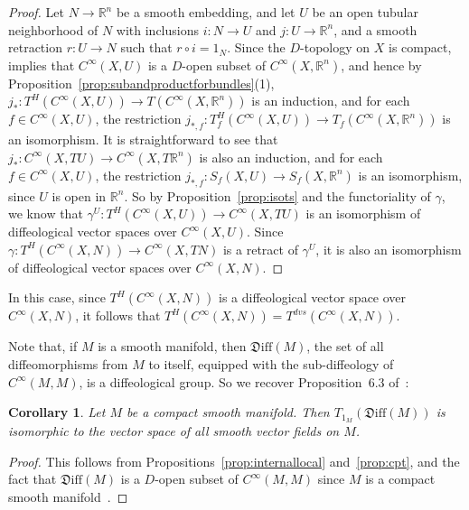 \documentclass{amsart}
\newtheorem{cor}[de]{Corollary}
\theoremstyle{remark}
\newcommand{\ra}{\to}
\newcommand{\Diff}{{\mathfrak{D}\mathrm{iff}}}
\def \R{\mathbb{R}}
\begin{document}
\begin{proof}
Let $N \ra \R^n$ be a smooth embedding,
and let $U$ be an open tubular neighborhood of $N$
with inclusions $i:N \ra U$ and $j:U \ra \R^n$,
and a smooth retraction $r:U \ra N$ such that $r \circ i=1_N$.
Since the $D$-topology on $X$ is compact,~\cite[Proposition~4.2]{CSW} implies that
$C^\infty(X,U)$ is a $D$-open subset of $C^\infty(X,\R^n)$,
and hence by Proposition~\ref{prop:subandproductforbundles}(1),
$j_*:T^H(C^\infty(X,U)) \ra T(C^\infty(X,\R^n))$ is an induction, and
for each $f \in C^\infty(X,U)$, the restriction
$j_{*,f}:T_f^H(C^\infty(X,U)) \ra T_f(C^\infty(X,\R^n))$ is an isomorphism.
It is straightforward to see that $j_*:C^\infty(X,TU) \ra C^\infty(X,T\R^n)$
is also an induction, and for each $f \in C^\infty(X,U)$,
the restriction $j_{*,f}:S_f(X,U) \ra S_f(X,\R^n)$
is an isomorphism, since $U$ is open in $\R^n$.
So by Proposition~\ref{prop:isots} and the functoriality of $\gamma$,
we know that $\gamma^U:T^H(C^\infty(X,U)) \ra C^\infty(X,TU)$ is an isomorphism
of diffeological vector spaces over $C^\infty(X,U)$.
Since $\gamma:T^H(C^\infty(X,N)) \ra C^\infty(X,TN)$ is a retract of $\gamma^U$,
it is also an isomorphism of diffeological vector spaces over $C^\infty(X,N)$.
\end{proof}

In this case, since $T^H(C^\infty(X,N))$ is
a diffeological vector space over $C^\infty(X,N)$,
it follows that $T^H(C^\infty(X,N))=T^{dvs}(C^\infty(X,N))$.

%
%
%
%
%
Note that, if $M$ is a smooth manifold,
then $\Diff(M)$, the set of all diffeomorphisms from $M$ to itself,
equipped with the sub-diffeology of $C^\infty(M,M)$,
is a diffeological group.
So we recover Proposition~6.3 of~\cite{HM}:

\begin{cor}\label{cor:cpt}
Let $M$ be a compact smooth manifold.
Then $T_{1_M}(\Diff(M))$ is isomorphic to the vector space of
all smooth vector fields on $M$.
\end{cor}
\begin{proof}
This follows from Propositions~\ref{prop:internallocal} and~\ref{prop:cpt},
and the fact that $\Diff(M)$ is a $D$-open subset of $C^\infty(M,M)$
since $M$ is a compact smooth manifold~\cite[Corollary~4.15]{CSW}.
\end{proof}
\end{document}
